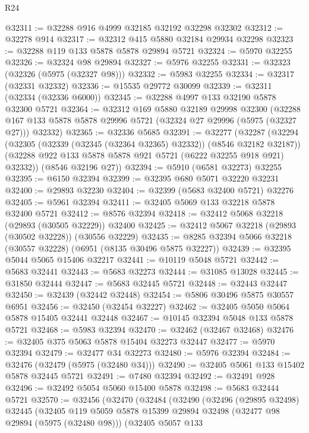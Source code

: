 \begin{lexlean}{R24}
\begin{coremodule}
@32311 := @32288 @916 @4999 @32185 @32192 @32298 @32302
@32312 := @32278 @914
@32317 := @32312 @415 @5880 @32184 @29934 @32298
@32323 := @32288 @119 @133 @5878 @5878 @29894 @5721
@32324 := @5970 @32255
@32326 := @32324 @98 @29894
@32327 := @5976 @32255
@32331 := @32323 (@32326 (@5975 (@32327 @98)))
@32332 := @5983 @32255
@32334 := @32317 (@32331 @32332)
@32336 := @15535 @29772 @30099
@32339 := @32311 (@32334 (@32336 @6000))
@32345 := @32288 @4997 @133 @32190 @5878 @32300 @5721
@32364 := @32312
    @169
    @5880
    @32189
    @29998
    @32300
    (@32288 @167 @133 @5878 @5878 @29996 @5721 (@32324 @27 @29996 (@5975 (@32327 @27))) @32332)
@32365 := @32336 @5685
@32391 := @32277
    (@32287
      (@32294
        (@32305 (@32339 (@32345 (@32364 @32365) @32332)) (@8546 @32182 @32187))
        (@32288 @922 @133 @5878 @5878 @921 @5721 (@6222 @32255 @918 @921) @32332))
      (@8546 @32196 @27))
@32394 := @5910 (@6581 @32273) @32255
@32395 := @6150 @32394
@32399 := @32395 @680 @5071 @32220 @32231
@32400 := @29893 @32230
@32404 := @32399 (@5683 @32400 @5721) @32276
@32405 := @5961 @32394
@32411 := @32405 @5069 @133 @32218 @5878 @32400 @5721
@32412 := @8576 @32394
@32418 := @32412 @5068 @32218 (@29893 (@30505 @32229)) @32400
@32425 := @32412 @5067 @32218 (@29893 (@30502 @32228)) (@30556 @32229)
@32435 := @8285 @32394 @5066 @32218 (@30557 @32228) (@6951 (@8135 @30496 @5875 @32227))
@32439 := @32395 @5044 @5065 @15406 @32217
@32441 := @10119 @5048 @5721
@32442 := @5683 @32441
@32443 := @5683 @32273
@32444 := @31085 @13028
@32445 := @31850 @32444
@32447 := @5683 @32445 @5721
@32448 := @32443 @32447
@32450 := @32439 (@32442 @32448)
@32454 := @5806 @30496 @5875 @30557 @6951
@32456 := @32450 (@32454 @32227)
@32462 := @32405 @5050 @5064 @5878 @15405 @32441 @32448
@32467 := @10145 @32394 @5048 @133 @5878 @5721
@32468 := @5983 @32394
@32470 := @32462 (@32467 @32468)
@32476 := @32405 @375 @5063 @5878 @15404 @32273 @32447
@32477 := @5970 @32394
@32479 := @32477 @34 @32273
@32480 := @5976 @32394
@32484 := @32476 (@32479 (@5975 (@32480 @34)))
@32490 := @32405 @5061 @133 @15402 @5878 @32445 @5721
@32491 := @7480 @32394
@32492 := @32491 @928
@32496 := @32492 @5054 @5060 @15400 @5878
@32498 := @5683 @32444 @5721
@32570 := @32456
    (@32470
      (@32484
        (@32490
          (@32496
            (@29895 @32498)
            @32445
            (@32405
              @119
              @5059
              @5878
              @15399
              @29894
              @32498
              (@32477 @98 @29894 (@5975 (@32480 @98)))
              (@32405
                @5057
                @133

\end{coremodule}
\end{lexlean}

